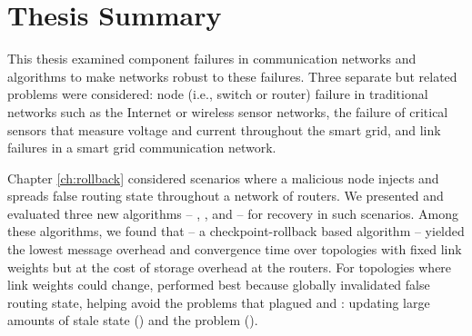 \section{Thesis Summary}
\label{sec:thesis-summary}

This thesis examined component failures in communication networks and algorithms to make networks robust to these failures.  
Three separate but related problems were considered: node (i.e., switch or router) failure in traditional networks such as the Internet or wireless sensor networks,
the failure of critical sensors that measure voltage and current throughout the smart grid, and link failures in a smart grid communication network.

Chapter \ref{ch:rollback} considered scenarios where a malicious node injects and spreads false routing state throughout a network of routers.
We presented and evaluated three new algorithms -- \seconds, \purges, and \cpr -- for recovery in such scenarios. %
Among these algorithms, we found that \cpr -- a checkpoint-rollback based algorithm -- yielded the lowest message overhead and convergence time over topologies
with fixed link weights but at the cost of storage overhead at the routers.
For topologies where link weights could change, \purge performed best because \purge globally invalidated false routing state, helping \purge avoid the problems that 
plagued \cpr and \seconds: updating large amounts of stale state (\cprs) and the \infinity problem (\seconds).



